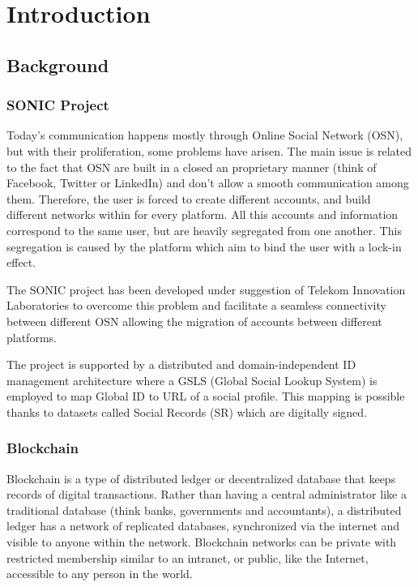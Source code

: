 \chapter{Introduction}
\label{introduction}

\section{Background}

\subsection{SONIC Project}
Today’s communication happens mostly through Online Social Network (OSN), but with their proliferation, some problems have arisen. The main issue is related to the fact that OSN are built in a closed an proprietary manner (think of Facebook, Twitter or LinkedIn) and don’t allow a smooth  communication among them. Therefore, the user is forced to create different accounts, and build different networks within for every platform. All this accounts and information correspond to the same user, but are heavily segregated from one another. This segregation is caused by the platform which aim to bind the user with a lock-in effect.

The SONIC project has been developed under suggestion of Telekom Innovation Laboratories to overcome this problem and facilitate a seamless connectivity between different OSN \cite{gondor2014sonic} allowing the migration of accounts between different platforms.

The project is supported by a distributed and domain-independent ID management architecture where a GSLS (Global Social Lookup System) is employed to map Global ID to URL of a social profile. This mapping is possible thanks to datasets called Social Records (SR) which are digitally signed.

\subsection{Blockchain}
Blockchain is a type of distributed ledger or decentralized database that keeps records of digital transactions. Rather than having a central administrator like a traditional database (think banks, governments and accountants), a distributed ledger has a network of replicated databases, synchronized via the internet and visible to anyone within the network. Blockchain networks can be private with restricted membership similar to an intranet, or public, like the Internet, accessible to any person in the world.

